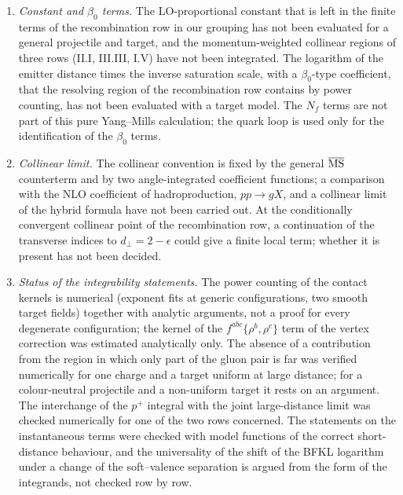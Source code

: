 \begin{enumerate}
\item[(v)] \emph{Constant and $\beta_0$ terms.} The LO-proportional constant that is left in the finite terms of the recombination row in our grouping has not been evaluated for a general projectile and target, and the momentum-weighted collinear regions of three rows (II.I, III.III, I.V) have not been integrated. The logarithm of the emitter distance times the inverse saturation scale, with a $\beta_0$-type coefficient, that the resolving region of the recombination row contains by power counting, has not been evaluated with a target model. The $N_f$ terms are not part of this pure Yang--Mills calculation; the quark loop is used only for the identification of the $\beta_0$ terms.
\item[(vi)] \emph{Collinear limit.} The collinear convention is fixed by the general $\overline{\rm MS}$ counterterm and by two angle-integrated coefficient functions; a comparison with the NLO coefficient of hadroproduction, $pp\to gX$, and a collinear limit of the hybrid formula have not been carried out. At the conditionally convergent collinear point of the recombination row, a continuation of the transverse indices to $d_\perp=2-\epsilon$ could give a finite local term; whether it is present has not been decided.
\item[(vii)] \emph{Status of the integrability statements.} The power counting of the contact kernels is numerical (exponent fits at generic configurations, two smooth target fields) together with analytic arguments, not a proof for every degenerate configuration; the kernel of the $f^{abc}\{\rho^b,\rho^c\}$ term of the vertex correction was estimated analytically only. The absence of a contribution from the region in which only part of the gluon pair is far was verified numerically for one charge and a target uniform at large distance; for a colour-neutral projectile and a non-uniform target it rests on an argument. The interchange of the $p^+$ integral with the joint large-distance limit was checked numerically for one of the two rows concerned. The statements on the instantaneous terms were checked with model functions of the correct short-distance behaviour, and the universality of the shift of the BFKL logarithm under a change of the soft--valence separation is argued from the form of the integrands, not checked row by row.
\end{enumerate}
